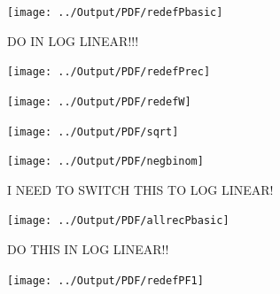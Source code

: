 \documentclass[12pt] {article}
\begin{document}
\pagebreak{}
\begin{table}
\caption{}
\label{Flo:Poisson Basic}\texttt{[image: ../Output/PDF/redefPbasic]}
\end{table}

\clearpage{}
\pagebreak{}
\begin{table}
\caption{DO IN LOG LINEAR!!!}
\label{Flo:Poisson Rec&Mort}\texttt{[image: ../Output/PDF/redefPrec]}
\end{table}

\pagebreak{}
\begin{table}
\caption{}
\label{Flo:County-basic}\texttt{[image: ../Output/PDF/redefW]}
\end{table}


\pagebreak{}
\clearpage{}
\begin{table}
\caption{}
\label{Flo:sqrt}
\texttt{[image: ../Output/PDF/sqrt]}
\end{table}

\pagebreak{}
\clearpage{}
\begin{table}
\caption{}
\label{Flo:negbinom}
\texttt{[image: ../Output/PDF/negbinom]}
\end{table}

\pagebreak{}
\clearpage{}
\begin{table}
\caption{I NEED TO SWITCH THIS TO LOG LINEAR!}
\label{Flo:allrecruits}
\texttt{[image: ../Output/PDF/allrecPbasic]}
\end{table}



\pagebreak{}
\clearpage{}
\begin{table}
\caption{}
\label{Flo:Rdeathslinear}
\scalebox{0.9}{

}
\end{table}


\pagebreak{}
\clearpage{}
\begin{table}
\caption{DO THIS IN LOG LINEAR!!}
\label{Flo:redefPF1}
\texttt{[image: ../Output/PDF/redefPF1]}
\end{table}
\end{document}
